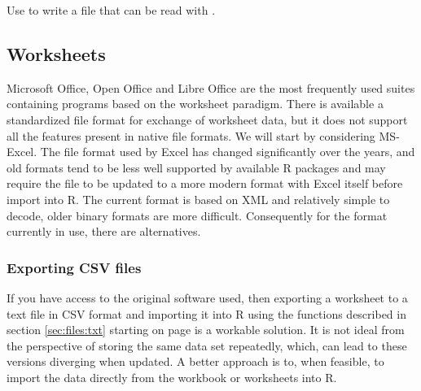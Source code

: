\documentclass[krantz2,ChapterTOCs]{krantz}\usepackage{knitr}
\begin{document}
\begin{advplayground}
Use  to write a file that can be read with .
\end{advplayground}

\subsection{Worksheets}\label{sec:files:worksheets}

Microsoft Office, Open Office and Libre Office are the most frequently used suites containing programs based on the worksheet paradigm. There is available a standardized file format for exchange of worksheet data, but it does not support all the features present in native file formats. We will start by considering MS-Excel. The file format used by Excel has changed significantly over the years, and old formats tend to be less well supported by available R packages and may require the file to be updated to a more modern format with Excel itself before import into R. The current format is based on XML and relatively simple to decode, older binary formats are more difficult. Consequently for the format currently in use, there are alternatives.

\subsubsection{Exporting CSV files}

If you have access to the original software used, then exporting a worksheet to a text file in CSV format and importing it into R using the functions described in section \ref{sec:files:txt} starting on page \pageref{sec:files:txt} is a workable solution. It is not ideal from the perspective of storing the same data set repeatedly, which, can lead to these versions diverging when updated. A better approach is to, when feasible, to import the data directly from the workbook or worksheets into R.

\subsubsection['readxl']{}\label{sec:files:excel}
\end{document}
